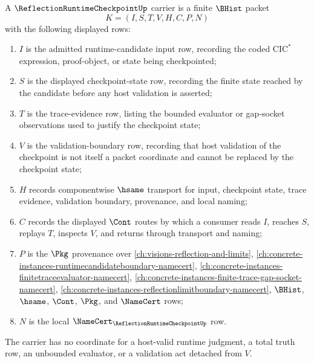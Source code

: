 \begin{definition}
\label{def:reflection-runtime-checkpoint-carrier}
A $\ReflectionRuntimeCheckpointUp$ carrier is a finite $\BHist$ packet
$$
K=(I,S,T,V,H,C,P,N)
$$
with the following displayed rows:
\begin{enumerate}
\item $I$ is the admitted runtime-candidate input row, recording the coded $\mathrm{CIC}^{*}$ expression, proof-object, or state being checkpointed;
\item $S$ is the displayed checkpoint-state row, recording the finite state reached by the candidate before any host validation is asserted;
\item $T$ is the trace-evidence row, listing the bounded evaluator or gap-socket observations used to justify the checkpoint state;
\item $V$ is the validation-boundary row, recording that host validation of the checkpoint is not itself a packet coordinate and cannot be replaced by the checkpoint state;
\item $H$ records componentwise $\hsame$ transport for input, checkpoint state, trace evidence, validation boundary, provenance, and local naming;
\item $C$ records the displayed $\Cont$ routes by which a consumer reads $I$, reaches $S$, replays $T$, inspects $V$, and returns through transport and naming;
\item $P$ is the $\Pkg$ provenance over \autoref{ch:visions-reflection-and-limits}, \autoref{ch:concrete-instances-runtimecandidateboundary-namecert}, \autoref{ch:concrete-instances-finitetraceevaluator-namecert}, \autoref{ch:concrete-instances-finite-trace-gap-socket-namecert}, \autoref{ch:concrete-instances-reflectionlimitboundary-namecert}, $\BHist$, $\hsame$, $\Cont$, $\Pkg$, and $\NameCert$ rows;
\item $N$ is the local $\NameCert_{\ReflectionRuntimeCheckpointUp}$ row.
\end{enumerate}
The carrier has no coordinate for a host-valid runtime judgment, a total truth row, an unbounded evaluator, or a validation act detached from $V$.
\end{definition}

